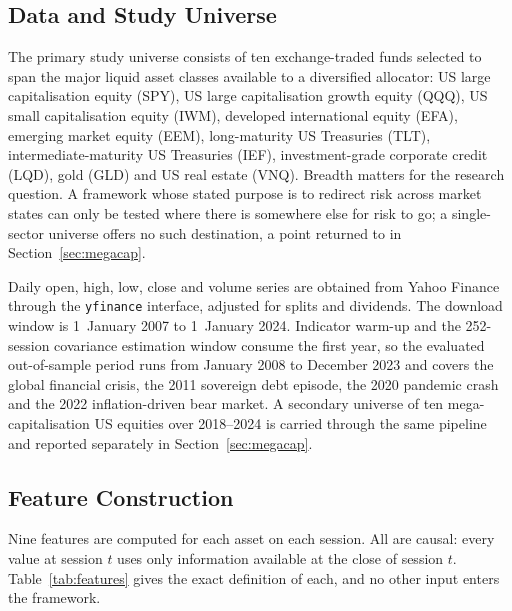 \documentclass{singlecol-new}
\theoremstyle{TH}{
\newtheorem{lemma}{Lemma}
\newtheorem{theorem}[lemma]{Theorem}
\newtheorem{corrolary}[lemma]{Corrolary}
\newtheorem{conjecture}[lemma]{Conjecture}
\newtheorem{proposition}[lemma]{Proposition}
\newtheorem{claim}[lemma]{Claim}
\newtheorem{stheorem}[lemma]{Wrong Theorem}
\newtheorem{algorithm}{Algorithm}
}
\theoremstyle{THrm}{
\newtheorem{definition}{Definition}[section]
\newtheorem{question}{Question}[section]
\newtheorem{remark}{Remark}
\newtheorem{scheme}{Scheme}
}
\theoremstyle{THhit}{
\newtheorem{case}{Case}[section]
}
\begin{document}
\subsection{Data and Study Universe}

The primary study universe consists of ten exchange-traded funds selected to span the
major liquid asset classes available to a diversified allocator: US large capitalisation
equity (SPY), US large capitalisation growth equity (QQQ), US small capitalisation
equity (IWM), developed international equity (EFA), emerging market equity (EEM),
long-maturity US Treasuries (TLT), intermediate-maturity US Treasuries (IEF),
investment-grade corporate credit (LQD), gold (GLD) and US real estate (VNQ). Breadth
matters for the research question. A framework whose stated purpose is to redirect risk
across market states can only be tested where there is somewhere else for risk to go;
a single-sector universe offers no such destination, a point returned to in
Section~\ref{sec:megacap}.

Daily open, high, low, close and volume series are obtained from Yahoo Finance through
the \texttt{yfinance} interface, adjusted for splits and dividends. The download window
is 1~January 2007 to 1~January 2024. Indicator warm-up and the 252-session covariance
estimation window consume the first year, so the evaluated out-of-sample period runs
from January 2008 to December 2023 and covers the global financial crisis, the 2011
sovereign debt episode, the 2020 pandemic crash and the 2022 inflation-driven bear
market. A secondary universe of ten mega-capitalisation US equities over 2018--2024 is
carried through the same pipeline and reported separately in
Section~\ref{sec:megacap}.

\subsection{Feature Construction}

Nine features are computed for each asset on each session. All are causal: every value
at session $t$ uses only information available at the close of session $t$. Table~\ref{tab:features}
gives the exact definition of each, and no other input enters the framework.
\end{document}
